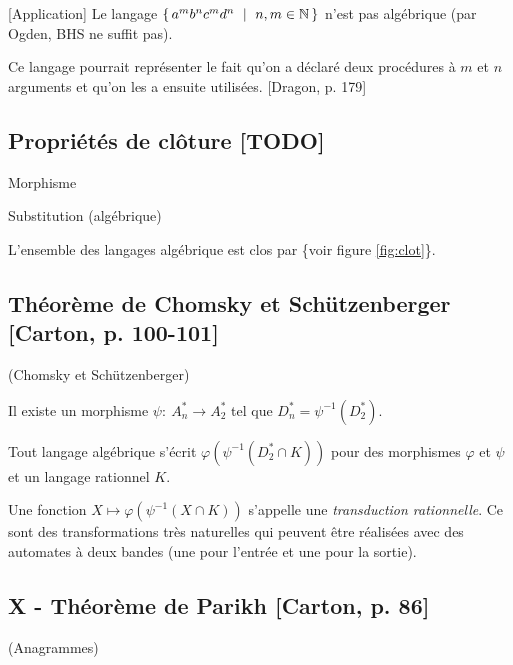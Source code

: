 \documentclass[../../agregation.tex]{subfiles}
\begin{document}
\begin{example}
	{[}Application{]} Le langage $\set{a^{m}b^{n}c^{m}d^{n}\ |\ n,m\in\mathbb{N}}$
	n'est pas algébrique (par Ogden, BHS ne suffit pas).
	
	Ce langage pourrait représenter le fait qu'on a déclaré deux procédures
	à $m$ et $n$ arguments et qu'on les a ensuite utilisées. {[}Dragon,
	p. 179{]}
\end{example}

\subsection{Propriétés de clôture {[}TODO{]}}
\begin{defn}
	Morphisme
\end{defn}

\begin{defn}
	Substitution (algébrique)\end{defn}
\begin{prop}
	L'ensemble des langages algébrique est clos par \{voir figure \ref{fig:clot}\}.
\end{prop}

\subsection{Théorème de Chomsky et Schützenberger {[}Carton, p. 100-101{]}}
\begin{thm}
	(Chomsky et Schützenberger)\end{thm}
\begin{lem}
	Il existe un morphisme $\psi:\ A_{n}^{*}\to A_{2}^{*}$ tel que $D_{n}^{*}=\psi^{-1}\left(D_{2}^{*}\right)$.\end{lem}
\begin{cor}
	Tout langage algébrique s'écrit $\varphi\left(\psi^{-1}\left(D_{2}^{*}\cap K\right)\right)$
	pour des morphismes $\varphi$ et $\psi$ et un langage rationnel
	$K$.\end{cor}
\begin{rem}
	Une fonction $X\mapsto\varphi\left(\psi^{-1}\left(X\cap K\right)\right)$
	s'appelle une \emph{transduction rationnelle}. Ce sont des transformations
	très naturelles qui peuvent être réalisées avec des automates à deux
	bandes (une pour l'entrée et une pour la sortie).
\end{rem}

\subsection{X - Théorème de Parikh {[}Carton, p. 86{]}}
\begin{defn}
	(Anagrammes)
\end{defn}
\end{document}
